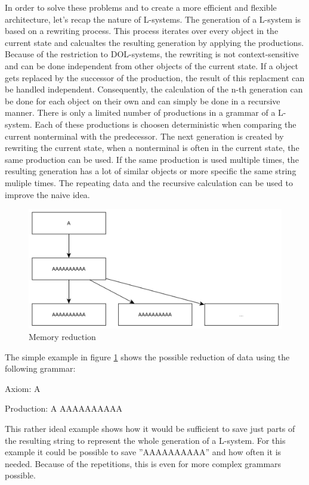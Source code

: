 \documentclass[english]{cpp-hmwk}
\begin{document}
\medskip
\noindent In order to solve these problems and to create a more efficient and flexible architecture, let's recap the nature of L-systems. The generation of a L-system is based on a rewriting process. This process iterates over every object in the current state and calcualtes the resulting generation by applying the productions. Because of the restriction to DOL-systems, the rewriting is not context-sensitive and can be done independent from other objects of the current state. If a object gets replaced by the successor of the production, the result of this replacment can be handled independent. Consequently, the calculation of the n-th generation can be done for each object on their own and can simply be done in a recursive manner.\newline
There is only a limited number of productions in a grammar of a L-system. Each of these productions is choosen deterministic when comparing the current nonterminal with the predecessor. The next generation is created by rewriting the current state, when a nonterminal is often in the current state, the same production can be used. If the same production is used multiple times, the resulting generation has a lot of similar objects or more specific the same string muliple times. The repeating data and the recursive calculation can be used to improve the naive idea.

\medskip
\begin{figure}[h!]
	\centering
	\includegraphics[width=0.8\columnwidth]{../graphs/LSystem/examples/simple_grammar_data_doubling.png}
	\caption{Memory reduction}
	\label{figure:lsystem_mem_reduction}
\end{figure}

\noindent The simple example in figure \ref{figure:lsystem_mem_reduction} shows the possible reduction of data using the following grammar:

Axiom: A

Production: A \rightarrow AAAAAAAAAA 

\medskip
\noindent This rather ideal example shows how it would be sufficient to save just parts of the resulting string to represent the whole generation of a L-system. For this example it could be possible to save ''AAAAAAAAAA'' and how often it is needed. Because of the repetitions, this is even for more complex grammars possible.
\end{document}
